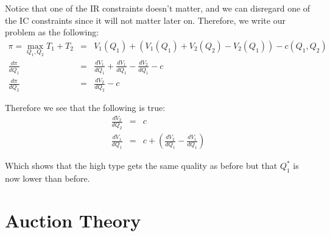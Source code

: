 \documentclass[12pt]{article}
\begin{document}
Notice that one of the IR constraints doesn't matter, and we can disregard one of the IC constraints since it will not matter later on. Therefore, we write our problem as the following:
\begin{eqnarray}
\pi = \max_{Q_1, Q_2} T_1 + T_2 &=& V_1(Q_1) + (V_1(Q_1) + V_2(Q_2) - V_2(Q_1)) - c(Q_1, Q_2) \\
\frac{d \pi}{d Q_1} &=& \frac{d V_1}{d Q_1} + \frac{d V_1}{d Q_1} - \frac{d V_2}{d Q_1} - c \\
\frac{d \pi}{d Q_2} &=& \frac{d V_2}{d Q_2} - c 
\end{eqnarray}

Therefore we see that the following is true:
\begin{eqnarray}
\frac{d V_2}{d Q_2} &=& c \\
\frac{d V_1}{d Q_1} &=& c + \left( \frac{d V_2}{d Q_1} - \frac{d V_1}{d Q_1} \right)
\end{eqnarray}

Which shows that the high type gets the same quality as before but that $Q_1^*$ is now lower than before. 

\section{Auction Theory}
\end{document}
